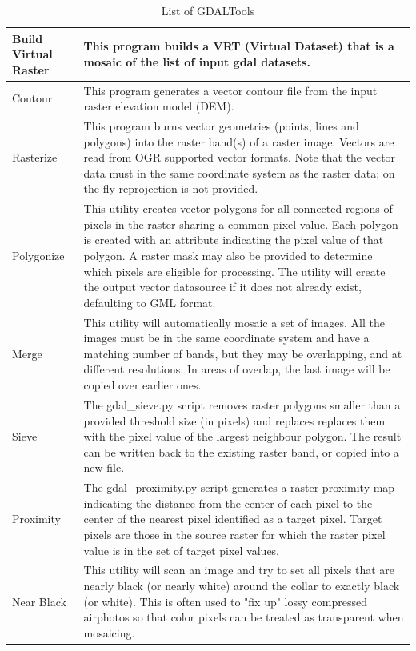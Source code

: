 \begin{table}[ht]
\centering
\caption{List of GDALTools}\medskip
 \begin{tabular}{|l|p{4in}|}
\hline Build Virtual Raster & This program builds a VRT (Virtual Dataset) that is a mosaic of the list of input gdal datasets. \\
\hline Contour & This program generates a vector contour file from the input raster elevation model (DEM).\\
\hline Rasterize &  This program burns vector geometries (points, lines and polygons) into the raster band(s) of a raster image. Vectors are read from OGR supported vector formats. Note that the vector data must in the same coordinate system as the raster data; on the fly reprojection is not provided.\\
\hline Polygonize & This utility creates vector polygons for all connected regions of pixels in the raster sharing a common pixel value. Each polygon is created with an attribute indicating the pixel value of that polygon. A raster mask may also be provided to determine which pixels are eligible for processing.
The utility will create the output vector datasource if it does not already exist, defaulting to GML format.\\
\hline Merge &  This utility will automatically mosaic a set of images. All the images must be in the same coordinate system and have a matching number of bands, but they may be overlapping, and at different resolutions. In areas of overlap, the last image will be copied over earlier ones. \\
\hline Sieve & The gdal\_sieve.py script removes raster polygons smaller than a provided threshold size (in pixels) and replaces replaces them with the pixel value of the largest neighbour polygon. The result can be written back to the existing raster band, or copied into a new file.\\
\hline Proximity & The gdal\_proximity.py script generates a raster proximity map indicating the distance from the center of each pixel to the center of the nearest pixel identified as a target pixel. Target pixels are those in the source raster for which the raster pixel value is in the set of target pixel values.\\
\hline Near Black & This utility will scan an image and try to set all pixels that are nearly black (or nearly white) around the collar to exactly black (or white). This is often used to "fix up" lossy compressed airphotos so that color pixels can be treated as transparent when mosaicing.\\

\end{tabular}
\end{table}
